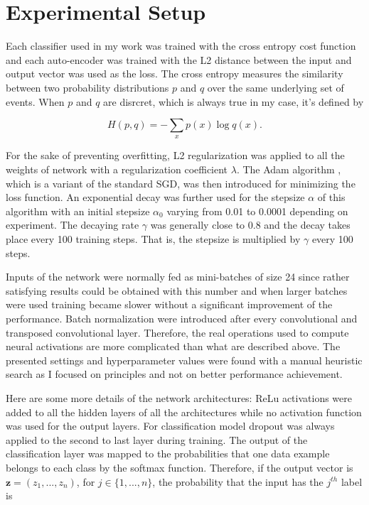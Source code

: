 \section{Experimental Setup} \label{section:exp}

Each classifier used in my work was trained with the cross entropy cost
function and each auto-encoder was trained with the L2 distance between
the input and output vector was used as the loss.
The cross entropy measures the similarity between two probability
distributions $p$ and $q$ over the same underlying set of events.
When $p$ and $q$ are disrcret, which is always true in my case, it's
defined by

\[H(p,q) = -\sum_xp(x)\log q(x).\]

For the sake of preventing overfitting, L2
regularization \cite{Y. Bengio 2012} was applied to all the weights of
network with a regularization coefficient $\lambda$.
The Adam algorithm \cite{D. Kingma 2014}, which is a variant of the
standard SGD, was then introduced for minimizing the loss function.
An exponential decay was further used for the stepsize $\alpha$ of this
algorithm with an initial stepsize $\alpha_0$ varying from 0.01 to 0.0001
depending on experiment. The decaying rate $\gamma$
was generally close to 0.8 and the decay takes place every 100
training steps. That is, the stepsize is multiplied by $\gamma$ every
100 steps.

Inputs of the network were normally fed as mini-batches of size 24
since rather satisfying results could be obtained with this
number and when larger batches were used training became slower
without a significant improvement of the performance.
Batch normalization \cite{S. Ioffe 2015} were introduced after every
convolutional and transposed convolutional layer. Therefore, the real
operations used to compute neural activations are more complicated
than what are described above. The presented settings and hyperparameter
values were found with a manual heuristic search as I focused on
principles and not on better performance achievement.

Here are some more details of the network architectures: ReLu activations 
were added to all the hidden layers of all the architectures
\cite{A. Krizhevsky 2012} while no activation function was used for
the output layers.
For classification model dropout \cite{N. Srivastava 2014}
was always applied to the second to last layer during training.
The output of the classification layer was mapped to the probabilities
that one data example belongs to each class by the softmax function.
Therefore, if the output vector is $\mathbf{z} = (z_1, ..., z_n)$,
for $j \in \{1,...,n\}$, the probability that the input has the $j^{th}$
label is

